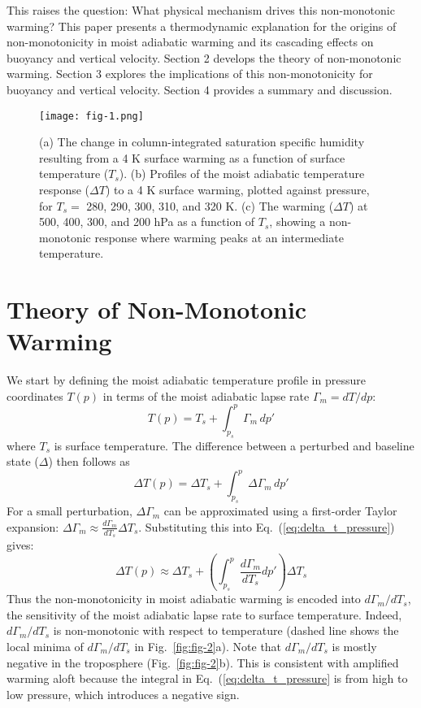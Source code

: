 \documentclass[draft]{ametsocV6.1}
\begin{document}
This raises the question: What physical mechanism drives this non-monotonic warming? This paper presents a thermodynamic explanation for the origins of non-monotonicity in moist adiabatic warming and its cascading effects on buoyancy and vertical velocity. Section 2 develops the theory of non-monotonic warming. Section 3 explores the implications of this non-monotonicity for buoyancy and vertical velocity. Section 4 provides a summary and discussion.

\begin{figure}[htbp]
 \centering
 \texttt{[image: fig-1.png]}\\
\caption{(a) The change in column-integrated saturation specific humidity resulting from a 4 K surface warming as a function of surface temperature ($T_s$). (b) Profiles of the moist adiabatic temperature response ($\Delta T$) to a 4 K surface warming, plotted against pressure, for $T_s = $ 280, 290, 300, 310, and 320 K. (c) The warming ($\Delta T$) at 500, 400, 300, and 200 hPa as a function of $T_s$, showing a non-monotonic response where warming peaks at an intermediate temperature.}
\label{fig:fig-1}
\end{figure}

\section{Theory of Non-Monotonic Warming}
We start by defining the moist adiabatic temperature profile in pressure coordinates $T(p)$ in terms of the moist adiabatic lapse rate $\Gamma_m = dT/dp$:
\begin{equation}
T(p) = T_s + \int_{p_s}^{p} \Gamma_m \, dp' \label{eq:temp_profile_pressure}
\end{equation}
where $T_s$ is surface temperature. The difference between a perturbed and baseline state ($\Delta$) then follows as
\begin{equation}
\Delta T(p) = \Delta T_s + \int_{p_s}^{p} \Delta\Gamma_m \, dp' \label{eq:delta_t_pressure}
\end{equation}
For a small perturbation, $\Delta \Gamma_m$ can be approximated using a first-order Taylor expansion: $\Delta\Gamma_m \approx \frac{d\Gamma_m}{dT_s}\Delta T_s$. Substituting this into Eq.~(\ref{eq:delta_t_pressure}) gives:
\begin{equation}
\Delta T(p) \approx \Delta T_s + \left(\int_{p_s}^{p} \frac{d\Gamma_m}{dT_s}dp'\right)\Delta T_s \label{eq:delta_t_taylor_pressure}
\end{equation}
Thus the non-monotonicity in moist adiabatic warming is encoded into $d\Gamma_m/dT_s$, the sensitivity of the moist adiabatic lapse rate to surface temperature. Indeed, $d\Gamma_m/dT_s$ is non-monotonic with respect to temperature (dashed line shows the local minima of $d\Gamma_m/dT_s$ in Fig.~\ref{fig:fig-2}a). Note that $d\Gamma_m/dT_s$ is mostly negative in the troposphere (Fig.~\ref{fig:fig-2}b). This is consistent with amplified warming aloft because the integral in Eq.~(\ref{eq:delta_t_pressure} is from high to low pressure, which introduces a negative sign.
\end{document}
